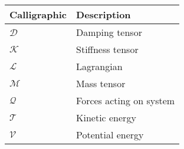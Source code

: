 \begin{spacing}{0.9}
\begin{multicols}{2}
\begin{table}[H]
\centering
    \begin{tabular}{p{2.5cm} p{4cm}} \hline
    \textbf{Calligraphic}    &   \textbf{Description }\\ \hline

    $\mathcal{D}$     &  Damping tensor \\
    $\mathcal{K}$     &  Stiffness tensor \\
    $\mathcal{L}$     &  Lagrangian \\
    $\mathcal{M}$     &  Mass tensor \\
    $\mathcal{Q}$     &  Forces acting on system \\
    $\mathcal{T}$     &  Kinetic energy \\
    $\mathcal{V}$     &  Potential energy \\ \hline
    \end{tabular}
\end{table}




\end{multicols}
\end{spacing}
